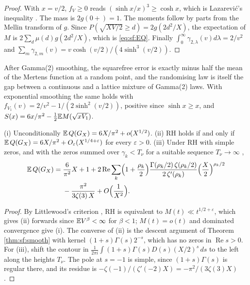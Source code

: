 \begin{proof}
With $x=v/2$, $f_V\ge0$ reads $(\sinh x/x)^3\ge\cosh x$, which is Lazarevi\'c's inequality \cite{lazarevic1966}. The mass is $2g(0+)=1$. The moments follow by parts from the Mellin transform of $g$. Since $P(\sqrt{XV/2}\ge d)=2g(2d^2/X)$, the expectation of $M$ is $2\sum_d\mu(d)g(2d^2/X)$, which is \eqref{eq:sf:EQ}. Finally $\int_0^\infty\gamma_{2,\lambda}(v)d\lambda=2/v^2$ and $\sum_m\gamma_{2,m}(v)=v\cosh(v/2)/(4\sinh^3(v/2))$.
\end{proof}

After Gamma(2) smoothing, the squarefree error is exactly minus half the mean of the Mertens function at a random point, and the randomising law is itself the gap between a continuous and a lattice mixture of Gamma(2) laws. With exponential smoothing the same holds with $f_{V_1}(v)=2/v^2-1/(2\sinh^2(v/2))$, positive since $\sinh x\ge x$, and $S(x)=6x/\pi^2-\frac12\mathbb{E} M(\sqrt{xV_1})$.

\begin{corollary}\label{cor:sf:mertens}
(i) Unconditionally $\mathbb{E}\,Q(G_X)=6X/\pi^2+o(X^{1/2})$. (ii) RH holds if and only if $\mathbb{E}\,Q(G_X)=6X/\pi^2+O_\varepsilon(X^{1/4+\varepsilon})$ for every $\varepsilon>0$. (iii) Under RH with simple zeros, and with the zeros summed over $\gamma_k<T_\nu$ for a suitable sequence $T_\nu\to\infty$ \cite[Ch.~14]{titchmarsh1986},
\[
\begin{aligned}
\mathbb{E}\,Q(G_X)={}&\frac{6}{\pi^2}X+1+2\operatorname{Re}\sum_k\Bigl(1+\frac{\rho_k}2\Bigr)\frac{\Gamma(\rho_k/2)\,\zeta(\rho_k/2)}{2\,\zeta'(\rho_k)}\Bigl(\frac X2\Bigr)^{\rho_k/2}\\
&-\frac{\pi^2}{3\zeta(3)\,X}+O\Bigl(\frac1{X^2}\Bigr).
\end{aligned}
\]
\end{corollary}

\begin{proof}
By Littlewood's criterion \cite[Ch.~14]{titchmarsh1986}, RH is equivalent to $M(t)\ll t^{1/2+\varepsilon}$, which gives (ii) forwards since $\mathbb{E} V^\beta<\infty$ for $\beta<1$; $M(t)=o(t)$ and dominated convergence give (i). The converse of (ii) is the descent argument of Theorem \ref{thm:sf:smooth} with kernel $(1+s)\Gamma(s)2^{-s}$, which has no zeros in $\operatorname{Re} s>0$. For (iii), shift the contour in $\frac1{2\pi i}\int(1+s)\Gamma(s)D(s)(X/2)^s\,ds$ to the left along the heights $T_\nu$. The pole at $s=-1$ is simple, since $(1+s)\Gamma(s)$ is regular there, and its residue is $-\zeta(-1)/(\zeta'(-2)X)=-\pi^2/(3\zeta(3)X)$.
\end{proof}

